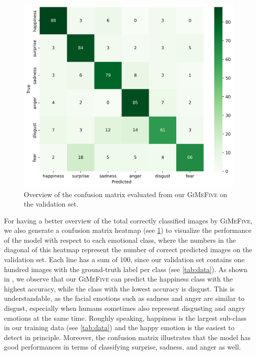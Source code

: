 \begin{figure}[ht]
  \centering
   \includegraphics[width=\linewidth]{matval.png}
   \caption{Overview of the confusion matrix evaluated from our \textsc{GiMeFive} on the validation set.} 
   \label{fig:matval}
\end{figure}

For having a better overview of the total correctly classified images by \textsc{GiMeFive}, 
we also generate a confusion matrix heatmap (see \cref{fig:matval}) to visualize the performance of the model with respect to each emotional class, 
where the numbers in the diagonal of this heatmap represent the number of correct predicted images on the validation set. 
Each line has a sum of 100, 
since our validation set contains one hundred images with the ground-truth label per class (see \cref{tab:data}). 
As shown in , 
we observe that our \textsc{GiMeFive} can predict the happiness class with the highest accuracy, 
while the class with the lowest accuracy is disgust. 
This is understandable, 
as the facial emotions such as sadness and anger are similar to disgust, 
especially when humans sometimes also represent disgusting and angry emotions at the same time. 
Roughly speaking, 
happiness is the largest sub-class in our training data (see \cref{tab:data}) and the happy emotion is the easiest to detect in principle. 
Moreover, 
the confusion matrix illustrates that the model has good performances in terms of classifying surprise, sadness, and anger as well. 

